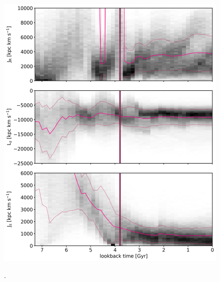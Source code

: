 \begin{figure}[htbp]
    \centering
	\includegraphics[width=\textwidth]{plots/Dynamics/prog2/action_time_evolution_hist_mean.png}
	\label{fig:time_ev_all_GCs}
	\caption{.}
\end{figure}
